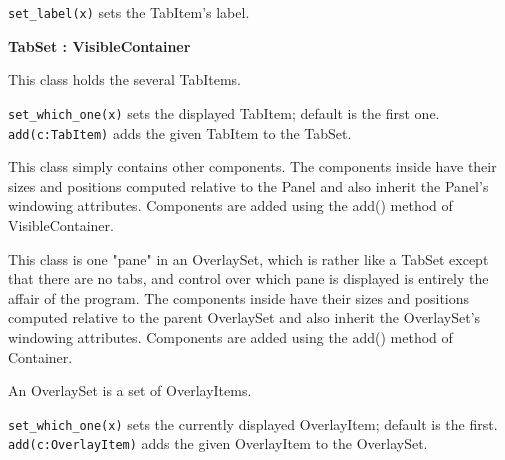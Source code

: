 \texttt{set\_label(x)} sets the TabItem's label.

{\ttfamily\bfseries
{}TabSet : VisibleContainer}

This class holds the several TabItems.

\texttt{set\_which\_one(x)} sets the displayed TabItem;
default is the first one.\\
\texttt{add(c:TabItem)} adds the given TabItem to the TabSet.


This class simply contains other components. The components inside have
their sizes and positions computed relative to the Panel and also
inherit the Panel's windowing attributes. Components
are added using the add() method of VisibleContainer.


This class is one "pane" in an OverlaySet,
which is rather like a TabSet except that there are no tabs, and
control over which pane is displayed is entirely the affair of the
program. The components inside have their sizes and positions computed
relative to the parent OverlaySet and also inherit the
OverlaySet's windowing attributes. Components are
added using the add() method of Container.


An OverlaySet is a set of OverlayItems.

\texttt{set\_which\_one(x)} sets the currently displayed OverlayItem;
default is the first.\\
\texttt{add(c:OverlayItem)} adds the given OverlayItem to the OverlaySet.

\newpage
